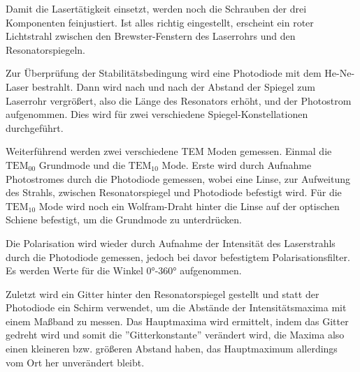 \noindent Damit die Lasertätigkeit einsetzt, werden noch die Schrauben der drei Komponenten feinjustiert. Ist alles richtig eingestellt, erscheint ein roter Lichtstrahl zwischen den Brewster-Fenstern des Laserrohrs und den Resonatorspiegeln.

\noindent Zur Überprüfung der Stabilitätsbedingung wird eine Photodiode mit dem He-Ne-Laser bestrahlt. Dann wird nach und nach der Abstand der Spiegel zum Laserrohr vergrößert, also die Länge des Resonators erhöht, und der Photostrom aufgenommen. Dies wird für zwei verschiedene Spiegel-Konstellationen durchgeführt.

\noindent Weiterführend werden zwei verschiedene TEM Moden gemessen. Einmal die \(\text{TEM}_{00}\) Grundmode und die \(\text{TEM}_{10}\) Mode. Erste wird durch Aufnahme Photostromes durch die Photodiode gemessen, wobei eine Linse, zur Aufweitung des Strahls, zwischen Resonatorspiegel und Photodiode befestigt wird. Für die \(\text{TEM}_{10}\) Mode wird noch ein Wolfram-Draht hinter die Linse auf der optischen Schiene befestigt, um die Grundmode zu unterdrücken.

\noindent Die Polarisation wird wieder durch Aufnahme der Intensität des Laserstrahls durch die Photodiode gemessen, jedoch bei davor befestigtem Polarisationsfilter. Es werden Werte für die Winkel 0°-360° aufgenommen.

\noindent Zuletzt wird ein Gitter hinter den Resonatorspiegel gestellt und statt der Photodiode ein Schirm verwendet, um die Abstände der Intensitätsmaxima mit einem Maßband zu messen. Das Hauptmaxima wird ermittelt, indem das Gitter gedreht wird und somit die ''Gitterkonstante'' verändert wird, die Maxima also einen kleineren bzw. größeren Abstand haben, das Hauptmaximum allerdings vom Ort her unverändert bleibt.